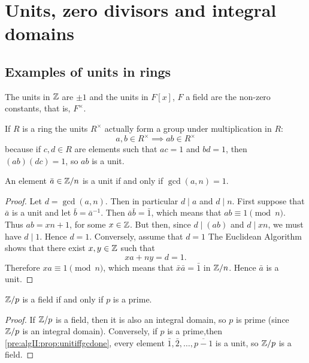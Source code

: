 \documentclass[10pt, a4paper]{article}
\begin{document}
\newpage

\section{Units,
zero divisors and integral domains}

\subsection{Examples of units in rings}

The units in $\mathbb{Z}$ are $\pm 1$ and the units in $F[x]$,
$F$ a field are the non-zero constants,
that is,
$F ^ {\times}$.

If $R$ is a ring the units $R ^ {\times}$ actually form a group under multiplication in $R$:
\[
a, b \in R ^ {\times} \implies ab \in R ^ {\times}
\]
because if $c, d \in R$ are elements such that $ac = 1$ and $bd = 1$,
then $(ab)(dc) = 1$,
so $ab$ is a unit.

\begin{proposition}\label{pre:algII:prop:unitiffgcdone}
    An element $\bar{a} \in \mathbb{Z} / n$ is a unit if and only if $\gcd(a, n) = 1$.

    \begin{proof}
        Let $d = \gcd(a, n)$.
        Then in particular $d \mid a$ and $d \mid n$.
        First suppose that $\bar{a}$ is a unit and let $\bar{b} = \bar{a} ^ {-1}$.
        Then $\bar{a}\bar{b} = \bar{1}$,
        which means that $ab \equiv 1\pmod{n}$.
        Thus $ab = xn + 1$,
        for some $x \in \mathbb{Z}$.
        But then,
        since $d \mid (ab)$ and $d \mid xn$,
        we must have $d \mid 1$.
        Hence $d = 1$.
        Conversely,
        assume that $d = 1$
        The Euclidean Algorithm shows that there exist $x, y \in \mathbb{Z}$ such that
        \[
        xa + ny = d = 1.
        \]
        Therefore $xa \equiv 1 \pmod{n}$,
        which means that $\bar{x}\bar{a} = \bar{1}$ in $\mathbb{Z} / n$.
        Hence $\bar{a}$ is a unit.
    \end{proof}
\end{proposition}

\begin{corollary}
    $\mathbb{Z} / p$ is a field if and only if $p$ is a prime.

    \begin{proof}
        If $\mathbb{Z} / p$ is a field,
        then it is also an integral domain,
        so $p$ is prime 
        (since $\mathbb{Z} / p$ is an integral domain).
        Conversely,
        if $p$ is a prime,then 
        \autoref{pre:algII:prop:unitiffgcdone},
        every element $\bar{1}, \bar{2}, \dotsc, \overline{p - 1}$ is a unit,
        so $\mathbb{Z} / p$ is a field.
    \end{proof}
\end{corollary}
\end{document}

